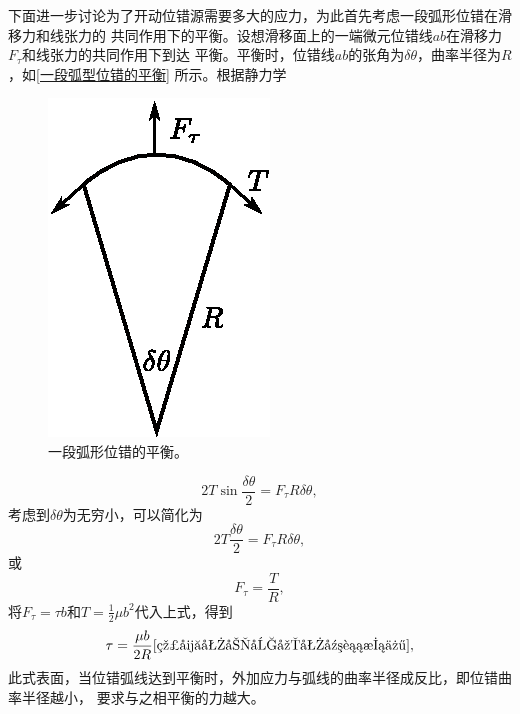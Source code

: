                 下面进一步讨论为了开动位错源需要多大的应力，为此首先考虑一段弧形位错在滑移力和线张力的
                共同作用下的平衡。设想滑移面上的一端微元位错线$ab$在滑移力$F_\tau$和线张力的共同作用下到达
                平衡。平衡时，位错线$ab$的张角为$\delta\theta$，曲率半径为$R$，如\autoref{一段弧型位错的平衡}
                所示。根据静力学
                \begin{figure}[ht]
                    \centering
                    \includegraphics[scale=1]{fig/balance_of_FR_source.eps}
                    \caption{一段弧形位错的平衡。}
                    \label{一段弧型位错的平衡}
                \end{figure}
                \begin{equation}
                    2T\sin\frac{\delta\theta}{2}=F_\tau R\delta\theta,
                \end{equation}
                考虑到$\delta\theta$为无穷小，可以简化为
                \begin{equation}
                    2T\frac{\delta\theta}{2}=F_\tau R\delta\theta,
                \end{equation}
                或
                \begin{equation}
                    F_\tau=\frac{T}{R},
                \end{equation}
                将$F_\tau=\tau b$和$T=\frac{1}{2}\mu b^2$代入上式，得到
                \begin{equation}
                    \tau=\frac{\mu b}{2R}\autoref{线张力和切应力平衡条件},
                \end{equation}
                此式表面，当位错弧线达到平衡时，外加应力与弧线的曲率半径成反比，即位错曲率半径越小，
                要求与之相平衡的力越大。

